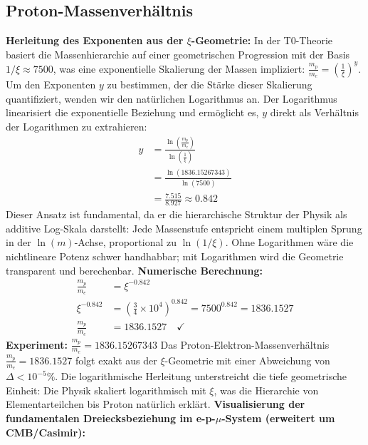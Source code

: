 	\subsection{Proton-Massenverhältnis}
	\textbf{Herleitung des Exponenten aus der $\xi$-Geometrie:}
	In der T0-Theorie basiert die Massenhierarchie auf einer geometrischen Progression mit der Basis $1/\xi \approx 7500$, was eine exponentielle Skalierung der Massen impliziert: $\frac{m_p}{m_e} = \left(\frac{1}{\xi}\right)^y$. Um den Exponenten $y$ zu bestimmen, der die Stärke dieser Skalierung quantifiziert, wenden wir den natürlichen Logarithmus an. Der Logarithmus linearisiert die exponentielle Beziehung und ermöglicht es, $y$ direkt als Verhältnis der Logarithmen zu extrahieren:
	\begin{align}
		y &= \frac{\ln \left( \frac{m_p}{m_e} \right)}{\ln \left( \frac{1}{\xi} \right)} \\
		&= \frac{\ln (1836.15267343)}{\ln (7500)} \\
		&= \frac{7.515}{8.927} \approx 0.842
	\end{align}
	Dieser Ansatz ist fundamental, da er die hierarchische Struktur der Physik als additive Log-Skala darstellt: Jede Massenstufe entspricht einem multiplen Sprung in der $\ln(m)$-Achse, proportional zu $\ln(1/\xi)$. Ohne Logarithmen wäre die nichtlineare Potenz schwer handhabbar; mit Logarithmen wird die Geometrie transparent und berechenbar.
	\textbf{Numerische Berechnung:}
	\begin{align}
		\frac{m_p}{m_e} &= \xi^{-0.842} \\
		\xi^{-0.842} &= \left( \frac{3}{4} \times 10^{4} \right)^{0.842} = 7500^{0.842} = 1836.1527 \\
		\frac{m_p}{m_e} &= 1836.1527 \quad \checkmark
	\end{align}
	\textbf{Experiment:} $\frac{m_p}{m_e} = 1836.15267343$
	Das Proton-Elektron-Massenverhältnis $\frac{m_p}{m_e} = 1836.1527$ folgt exakt aus der $\xi$-Geometrie mit einer Abweichung von $\Delta < 10^{-5}\%$. Die logarithmische Herleitung unterstreicht die tiefe geometrische Einheit: Die Physik skaliert logarithmisch mit $\xi$, was die Hierarchie von Elementarteilchen bis Proton natürlich erklärt.
	\textbf{Visualisierung der fundamentalen Dreiecksbeziehung im e-p-$\mu$-System (erweitert um CMB/Casimir):}

